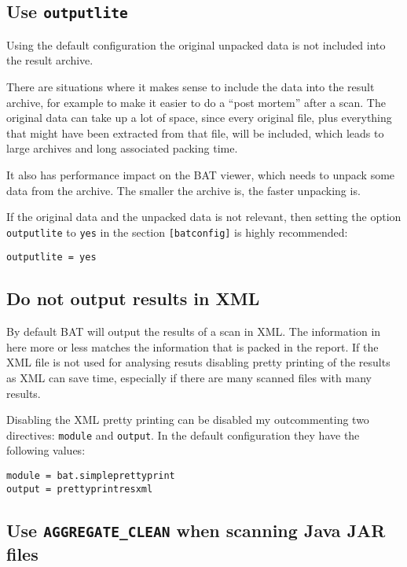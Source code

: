 \documentclass[10pt]{article}
\begin{document}
\subsection{Use \texttt{outputlite}}

Using the default configuration the original unpacked data is not included into
the result archive.

There are situations where it makes sense to include the data into the result
archive, for example to make it easier to do a ``post mortem'' after a scan.
The original data can take up a lot of space, since every original file, plus
everything that might have been extracted from that file, will be included,
which leads to large archives and long associated packing time.

It also has performance impact on the BAT viewer, which needs to unpack some
data from the archive. The smaller the archive is, the faster unpacking is.

If the original data and the unpacked data is not relevant, then setting the
option \texttt{outputlite} to \texttt{yes} in the section \texttt{[batconfig]}
is highly recommended:

\begin{verbatim}
outputlite = yes
\end{verbatim}

\subsection{Do not output results in XML}

By default BAT will output the results of a scan in XML. The information in
here more or less matches the information that is packed in the report. If the
XML file is not used for analysing resuts disabling pretty printing of the
results as XML can save time, especially if there are many scanned files with
many results.

Disabling the XML pretty printing can be disabled my outcommenting two
directives: \texttt{module} and \texttt{output}. In the default configuration
they have the following values:

\begin{verbatim}
module = bat.simpleprettyprint
output = prettyprintresxml
\end{verbatim}

\subsection{Use \texttt{AGGREGATE\_CLEAN} when scanning Java JAR files}
\end{document}
